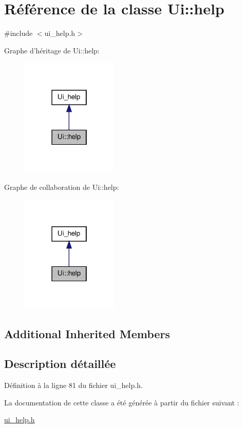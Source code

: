 \hypertarget{class_ui_1_1help}{\section{Référence de la classe Ui\-:\-:help}
\label{class_ui_1_1help}
}


{\ttfamily \#include $<$ui\-\_\-help.\-h$>$}



Graphe d'héritage de Ui\-:\-:help\-:\nopagebreak
\begin{figure}[H]
\begin{center}
\leavevmode
\includegraphics[width=130pt]{class_ui_1_1help__inherit__graph}
\end{center}
\end{figure}


Graphe de collaboration de Ui\-:\-:help\-:\nopagebreak
\begin{figure}[H]
\begin{center}
\leavevmode
\includegraphics[width=130pt]{class_ui_1_1help__coll__graph}
\end{center}
\end{figure}
\subsection*{Additional Inherited Members}


\subsection{Description détaillée}


Définition à la ligne 81 du fichier ui\-\_\-help.\-h.



La documentation de cette classe a été générée à partir du fichier suivant \-:\begin{DoxyCompactItemize}
\item 
\hyperlink{ui__help_8h}{ui\-\_\-help.\-h}\end{DoxyCompactItemize}
